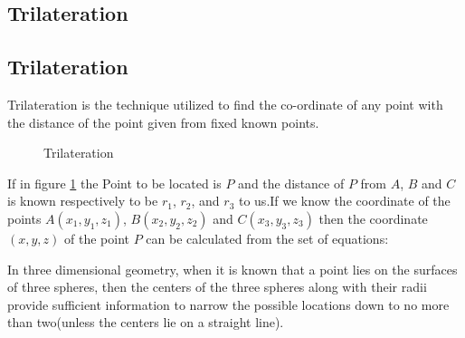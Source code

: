 \subsection{Trilateration}
\subsection{Trilateration}
Trilateration is the technique utilized to find the co-ordinate of any point with the distance of the point given from fixed known points.	

\begin{figure}[htpb]
	\centering
	\caption{Trilateration}
	\label{fig:Trilateration}
\end{figure}

If in figure \ref{fig:Trilateration} the Point to be located is $P$ and the distance of $P$ from $A$, $B$ and $C$ is known respectively to be $r_1$, $r_2$, and $r_3$ to us.If we know the coordinate of the points $A(x_1,y_1,z_1)$, $B(x_2,y_2,z_2)$ and $C(x_3,y_3,z_3)$ then the coordinate $(x,y,z)$ of the point $P$ can be calculated from the set of equations:


In three dimensional geometry, when it is known that a point lies on the surfaces of three spheres, then the centers of the three spheres along with their radii provide sufficient information to narrow the possible locations down to no more than two(unless the centers lie on a straight line).

